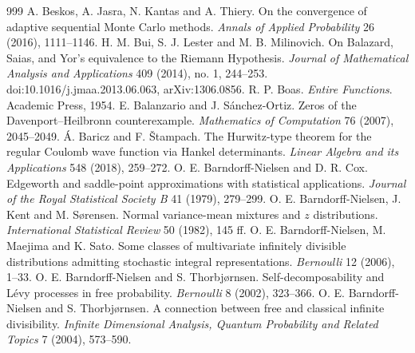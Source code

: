 \begin{thebibliography}{999}
 A. Beskos, A. Jasra, N. Kantas and A. Thiery. On the convergence of adaptive sequential Monte Carlo methods. \emph{Annals of Applied Probability} 26 (2016), 1111--1146.
 H. M. Bui, S. J. Lester and M. B. Milinovich. On Balazard, Saias, and Yor's equivalence to the Riemann Hypothesis. \emph{Journal of Mathematical Analysis and Applications} 409 (2014), no. 1, 244--253. doi:10.1016/j.jmaa.2013.06.063, arXiv:1306.0856.
 R. P. Boas. \emph{Entire Functions}. Academic Press, 1954.
 E. Balanzario and J. S\'anchez-Ortiz. Zeros of the Davenport--Heilbronn counterexample. \emph{Mathematics of Computation} 76 (2007), 2045--2049.
 \'A. Baricz and F. \v{S}tampach. The Hurwitz-type theorem for the regular Coulomb wave function via Hankel determinants. \emph{Linear Algebra and its Applications} 548 (2018), 259--272.
 O. E. Barndorff-Nielsen and D. R. Cox. Edgeworth and saddle-point approximations with statistical applications. \emph{Journal of the Royal Statistical Society B} 41 (1979), 279--299.
 O. E. Barndorff-Nielsen, J. Kent and M. S{\o}rensen. Normal variance-mean mixtures and $z$ distributions. \emph{International Statistical Review} 50 (1982), 145 ff.
 O. E. Barndorff-Nielsen, M. Maejima and K. Sato. Some classes of multivariate infinitely divisible distributions admitting stochastic integral representations. \emph{Bernoulli} 12 (2006), 1--33.
 O. E. Barndorff-Nielsen and S. Thorbj{\o}rnsen. Self-decomposability and L\'evy processes in free probability. \emph{Bernoulli} 8 (2002), 323--366.
 O. E. Barndorff-Nielsen and S. Thorbj{\o}rnsen. A connection between free and classical infinite divisibility. \emph{Infinite Dimensional Analysis, Quantum Probability and Related Topics} 7 (2004), 573--590.

\end{thebibliography}
